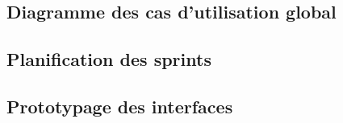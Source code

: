 \subsection{Diagramme des cas d’utilisation global}
 
\subsection{Planification des sprints}
 
\subsection{Prototypage des interfaces}
 


